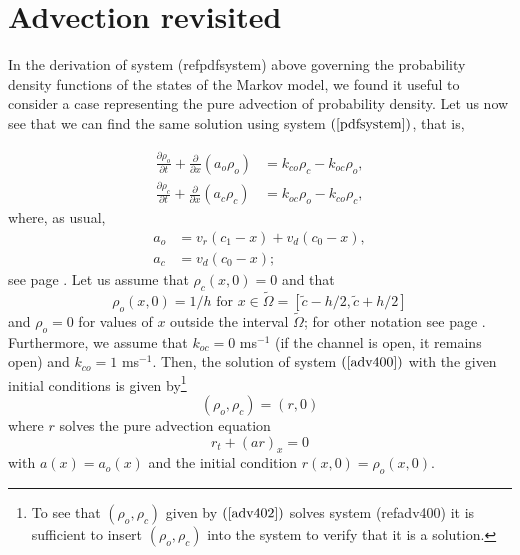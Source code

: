 \section{Advection revisited}

In the derivation of system (ref{pdfsystem})
above governing the probability density functions of the states of the Markov
model, we found it useful to consider a case representing the pure advection of probability density.
 Let us now see that we can find the same solution using system $\left(
\ref{pdfsystem}\right) $, that is, 

\begin{align}
\frac{\partial\rho_{o}}{\partial t}+\frac{\partial}{\partial x}\left(
a_{o}\rho_{o}\right)   &  =k_{co}\rho_{c}-k_{oc}\rho_{o},\label{adv400}\\
\frac{\partial\rho_{c}}{\partial t}+\frac{\partial}{\partial x}\left(
a_{c}\rho_{c}\right)   &  =k_{oc}\rho_{o}-k_{co}\rho_{c},\nonumber
\end{align}
where, as usual,
\begin{align}
a_{o} &  =v_{r}(c_{1}-x)+v_{d}(c_{0}-x),\label{adv401}\\
a_{c} &  =v_{d}(c_{0}-x);\nonumber
\end{align}
see page \pageref{system_def_99}. Let us assume that $\rho_{c}(x,0)=0$ and
that
 \begin{equation} 
 \rho_o (x,0)=1/h \text{ for } x\in \tilde{\Omega} = [\tilde{c}-h/2,\tilde{c}+h/2 ] \label{adv_init_open}
 \end{equation}
and $\rho_o=0$ for values of $x$ outside the interval $\tilde{\Omega}$; 
for other notation see page \pageref{advectprobability}.  
Furthermore, we assume that $k_{oc}=0$ ms$^{-1}$ (if the channel is open, it
remains open) and $k_{co}=1$ ms$^{-1}$. Then, the solution of system  $\left(
\ref{adv400}\right)  $ with the given initial conditions is given
by\footnote{To see that $\left(  \rho_{o},\rho_{c}\right)  $ given by $\left(
\ref{adv402}\right)  $ solves system (ref{adv400}) it
is sufficient to insert $\left(  \rho_{o},\rho_{c}\right)  $ into the
system to verify that it is a solution. }
\begin{equation}
\left(  \rho_{o},\rho_{c}\right)  =\left(  r,0\right)  \label{adv402}
\end{equation}
where $r$ solves the pure advection equation
\begin{equation}
r_{t}+\left(  ar\right)  _{x}=0\label{adv403}
\end{equation}
with $a(x)=a_{o}(x)$ and the initial condition $r(x,0)=\rho_{o}(x,0).$ 


